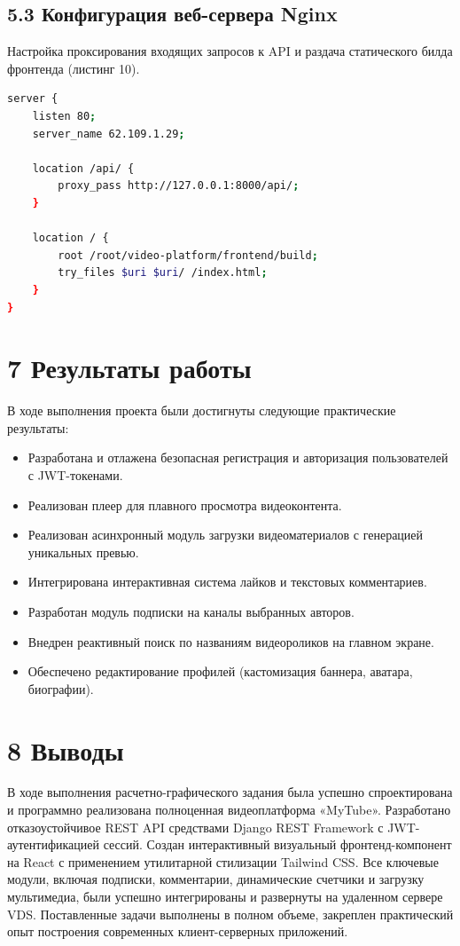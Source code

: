 \documentclass[a4paper,14pt,oneside,openany]{memoir}
\begin{document}
\subsection{5.3 Конфигурация веб-сервера Nginx}
Настройка проксирования входящих запросов к API и раздача статического билда фронтенда (листинг 10).

\begin{lstlisting}[language=bash, caption={Конфигурационный файл Nginx}]
server {
    listen 80;
    server_name 62.109.1.29;

    location /api/ {
        proxy_pass http://127.0.0.1:8000/api/;
    }

    location / {
        root /root/video-platform/frontend/build;
        try_files $uri $uri/ /index.html;
    }
}
\end{lstlisting}

\section{7 Результаты работы}
В ходе выполнения проекта были достигнуты следующие практические результаты:
\begin{itemize}
    \item Разработана и отлажена безопасная регистрация и авторизация пользователей с JWT-токенами.
    \item Реализован плеер для плавного просмотра видеоконтента.
    \item Реализован асинхронный модуль загрузки видеоматериалов с генерацией уникальных превью.
    \item Интегрирована интерактивная система лайков и текстовых комментариев.
    \item Разработан модуль подписки на каналы выбранных авторов.
    \item Внедрен реактивный поиск по названиям видеороликов на главном экране.
    \item Обеспечено редактирование профилей (кастомизация баннера, аватара, биографии).
\end{itemize}

\section{8 Выводы}
В ходе выполнения расчетно-графического задания была успешно спроектирована и программно реализована полноценная видеоплатформа «MyTube». Разработано отказоустойчивое REST API средствами Django REST Framework с JWT-аутентификацией сессий. Создан интерактивный визуальный фронтенд-компонент на React с применением утилитарной стилизации Tailwind CSS. Все ключевые модули, включая подписки, комментарии, динамические счетчики и загрузку мультимедиа, были успешно интегрированы и развернуты на удаленном сервере VDS. Поставленные задачи выполнены в полном объеме, закреплен практический опыт построения современных клиент-серверных приложений.
\end{document}
